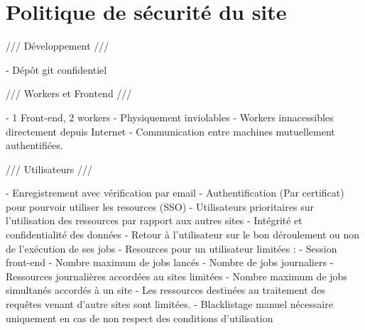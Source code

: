 \newpage

\chapter{Politique de sécurité du site}

/// Développement ///

- Dépôt git confidentiel

/// Workers et Frontend ///

- 1 Front-end, 2 workers
- Physiquement inviolables
- Workers innacessibles directement depuis Internet
- Communication entre machines mutuellement authentifiées.


/// Utilisateurs ///

- Enregistrement avec vérification par email
- Authentification (Par certificat) pour pourvoir utiliser les resources (SSO)
- Utilisateurs prioritaires sur l'utilisation des ressources par rapport aux autres sites
- Intégrité et confidentialité des données
- Retour à l'utilisateur sur le bon déroulement ou non de l'exécution de ses jobs 
- Resources pour un utilisateur limitées :
	- Session front-end
	- Nombre maximum de jobs lancés
	- Nombre de jobs journaliers
- Ressources journalières accordées au sites limitées
- Nombre maximum de jobs simultanés accordés à un site
- Les ressources destinées au traitement des requêtes venant d'autre sites sont limitées.
- Blacklistage manuel nécessaire uniquement en cas de non respect des conditions d'utilisation
 
